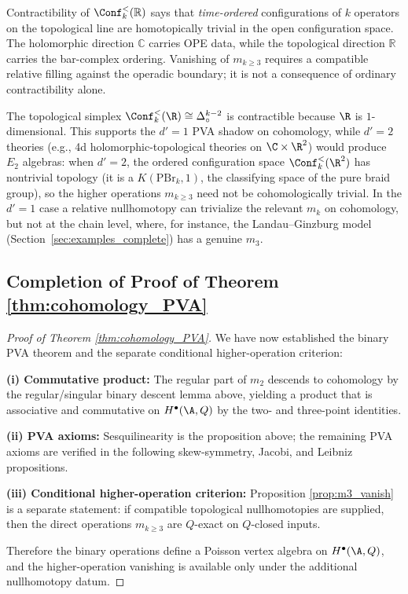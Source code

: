 \begin{remark}
Contractibility of $\Conf_k^{<}(\mathbb{R})$ says that
\emph{time-ordered} configurations of $k$ operators on the topological
line are homotopically trivial in the open configuration space. The
holomorphic direction $\mathbb{C}$ carries OPE data, while the
topological direction $\mathbb{R}$ carries the bar-complex ordering.
Vanishing of $m_{k \geq 3}$ requires a compatible relative filling
against the operadic boundary; it is not a consequence of ordinary
contractibility alone.
\end{remark}

\begin{remark}[Why $d'=1$ produces PVAs and $d'=2$ produces $E_2$ algebras]
The topological simplex
$\Conf_k^{<}(\R) \cong \Delta^{k-2}_{\circ}$ is contractible
because $\R$ is $1$-dimensional. This supports the $d'=1$
PVA shadow on cohomology, while $d'=2$ theories (e.g.,
4d holomorphic-topological theories on $\C \times \R^2$) would
produce $E_2$ algebras: when $d'=2$, the ordered configuration
space $\Conf_k^{<}(\R^2)$ has nontrivial topology (it is a
$K(\mathrm{PBr}_k,1)$, the classifying space of the pure braid
group), so the higher operations $m_{k \geq 3}$ need not be
cohomologically trivial. In the $d'=1$ case a relative
nullhomotopy can trivialize the relevant $m_k$ on cohomology, but
not at the chain level,
where, for instance, the Landau--Ginzburg model
(Section~\ref{sec:examples_complete}) has a genuine $m_3$.
\end{remark}

\subsection{Completion of Proof of Theorem \ref{thm:cohomology_PVA}}

\begin{proof}[Proof of Theorem \ref{thm:cohomology_PVA}]
We have now established the binary PVA theorem and the separate
conditional higher-operation criterion:

\textbf{(i) Commutative product:} The regular part of \(m_2\) descends
to cohomology by the regular/singular binary descent lemma above, yielding a product that
is associative and commutative on $H^\bullet(\A,Q)$ by the two- and
three-point identities.

\textbf{(ii) PVA axioms:} Sesquilinearity is the proposition above;
the remaining PVA axioms are verified in the following
skew-symmetry, Jacobi, and Leibniz propositions.

\textbf{(iii) Conditional higher-operation criterion:} Proposition
\ref{prop:m3_vanish} is a separate statement: if compatible
topological nullhomotopies are supplied, then the direct operations
\(m_{k\ge3}\) are \(Q\)-exact on \(Q\)-closed inputs.

Therefore the binary operations define a Poisson vertex algebra on
\(H^\bullet(\A,Q)\), and the higher-operation vanishing is available
only under the additional nullhomotopy datum.
\end{proof}


